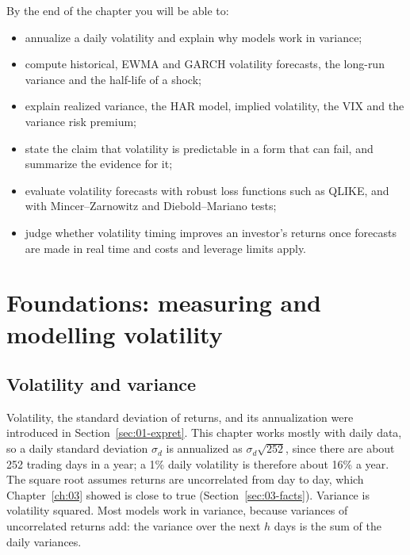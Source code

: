 By the end of the chapter you will be able to:

\begin{itemize}
  \item annualize a daily volatility and explain why models work in variance;
  \item compute historical, EWMA and GARCH volatility forecasts, the long-run variance and the half-life of a shock;
  \item explain realized variance, the HAR model, implied volatility, the VIX and the variance risk premium;
  \item state the claim that volatility is predictable in a form that can fail, and summarize the evidence for it;
  \item evaluate volatility forecasts with robust loss functions such as QLIKE, and with Mincer--Zarnowitz and Diebold--Mariano tests;
  \item judge whether volatility timing improves an investor's returns once forecasts are made in real time and costs and leverage limits apply.
\end{itemize}

\section{Foundations: measuring and modelling volatility}
\label{sec:14-foundations}

\subsection{Volatility and variance}

Volatility, the standard deviation of returns, and its annualization were introduced in Section~\ref{sec:01-expret}. This chapter works mostly with daily data, so a daily standard deviation $\sigma_d$ is annualized as $\sigma_d\sqrt{252}$, since there are about 252 trading days in a year; a 1\% daily volatility is therefore about 16\% a year. The square root assumes returns are uncorrelated from day to day, which Chapter~\ref{ch:03} showed is close to true (Section~\ref{sec:03-facts}). Variance is volatility squared. Most models work in variance, because variances of uncorrelated returns add: the variance over the next $h$ days is the sum of the daily variances.


